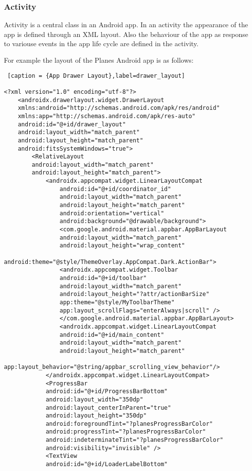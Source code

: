 \subsubsection { Activity }

Activity is a central class in an Android app. In an activity the appearance of the app is defined through an XML layout. Also the behaviour of the app as response to variouse events in the app life cycle are defined in the activity.

For example the layout of the Planes Android app is as follows:

\begin{lstlisting} [caption = {App Drawer Layout},label=drawer_layout]

<?xml version="1.0" encoding="utf-8"?>
	<androidx.drawerlayout.widget.DrawerLayout
	xmlns:android="http://schemas.android.com/apk/res/android"
	xmlns:app="http://schemas.android.com/apk/res-auto"
	android:id="@+id/drawer_layout"
	android:layout_width="match_parent"
	android:layout_height="match_parent"
	android:fitsSystemWindows="true">
		<RelativeLayout
		android:layout_width="match_parent"
		android:layout_height="match_parent">
			<androidx.appcompat.widget.LinearLayoutCompat
				android:id="@+id/coordinator_id"
				android:layout_width="match_parent"
				android:layout_height="match_parent"
				android:orientation="vertical"
				android:background="@drawable/background">
				<com.google.android.material.appbar.AppBarLayout
				android:layout_width="match_parent"
				android:layout_height="wrap_content"
				android:theme="@style/ThemeOverlay.AppCompat.Dark.ActionBar">
				<androidx.appcompat.widget.Toolbar
				android:id="@+id/toolbar"
				android:layout_width="match_parent"
				android:layout_height="?attr/actionBarSize"
				app:theme="@style/MyToolbarTheme"
				app:layout_scrollFlags="enterAlways|scroll" />
				</com.google.android.material.appbar.AppBarLayout>
				<androidx.appcompat.widget.LinearLayoutCompat
				android:id="@+id/main_content"
				android:layout_width="match_parent"
				android:layout_height="match_parent"
				app:layout_behavior="@string/appbar_scrolling_view_behavior"/>
			</androidx.appcompat.widget.LinearLayoutCompat>
			<ProgressBar
			android:id="@+id/ProgressBarBottom"
			android:layout_width="350dp"
			android:layout_centerInParent="true"
			android:layout_height="350dp"
			android:foregroundTint="?planesProgressBarColor"
			android:progressTint="?planesProgressBarColor"
			android:indeterminateTint="?planesProgressBarColor"
			android:visibility="invisible" />
			<TextView
			android:id="@+id/LoaderLabelBottom"

\end{lstlisting}

